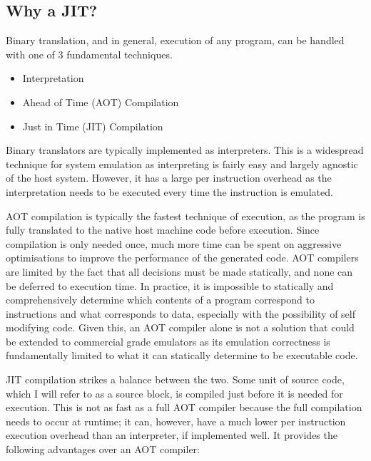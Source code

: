 \subsection{Why a JIT?}

Binary translation, and in general, execution of any program, can be handled with one of 3 fundamental techniques.

\begin{itemize}
    \item Interpretation
    \item Ahead of Time (AOT) Compilation
    \item Just in Time (JIT) Compilation
\end{itemize}

Binary translators are typically implemented as interpreters. This is a widespread technique for system emulation as interpreting is fairly easy and largely agnostic of the host system. However, it has a large per instruction overhead as the interpretation needs to be executed every time the instruction is emulated.

AOT compilation is typically the fastest technique of execution, as the program is fully translated to the native host machine code before execution. Since compilation is only needed once, much more time can be spent on aggressive optimisations to improve the performance of the generated code. AOT compilers are limited by the fact that all decisions must be made statically, and none can be deferred to execution time. In practice, it is impossible to statically and comprehensively determine which contents of a program correspond to instructions and what corresponds to data, especially with the possibility of self modifying code. Given this, an AOT compiler alone is not a solution that could be extended to commercial grade emulators as its emulation correctness is fundamentally limited to what it can statically determine to be executable code.

JIT compilation strikes a balance between the two. Some unit of source code, which I will refer to as a source block, is compiled just before it is needed for execution. This is not as fast as a full AOT compiler because the full compilation needs to occur at runtime; it can, however, have a much lower per instruction execution overhead than an interpreter, if implemented well. It provides the following advantages over an AOT compiler:

